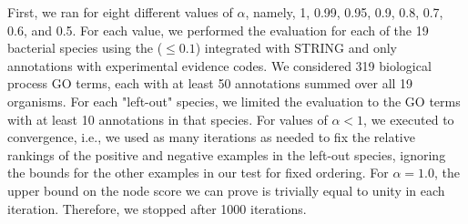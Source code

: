 First, we ran \sinksource for eight different values of $\alpha$, namely, 1, 0.99, 0.95, 0.9, 0.8, 0.7, 0.6, and 0.5. 
For each value, we performed the \loso evaluation for each of the 19 bacterial species using the \SSN (\eval $\leq 0.1$) integrated with STRING and only annotations with experimental evidence codes. We considered 319 biological process GO terms, each with at least 50 annotations summed over all 19 organisms. For each "left-out" species, we limited the evaluation to the GO terms with at least 10 annotations in that species.
For values of $\alpha < 1$, we executed \sinksource to convergence, i.e., we used as many iterations as needed to fix the relative rankings of the positive and negative examples in the left-out species, ignoring the bounds for the other examples in our test for fixed ordering.
For $\alpha = 1.0$, the upper bound on the node score we can prove is trivially equal to unity in each iteration. 
Therefore, we stopped \sinksource after 1000 iterations. 

